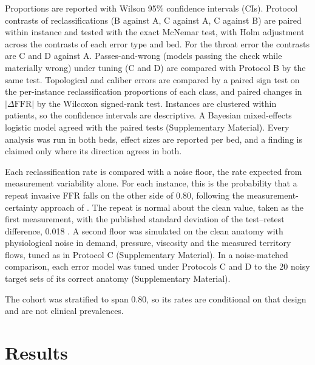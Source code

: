 \documentclass[journal,twoside,web]{ieeecolor}
\begin{document}
Proportions are reported with Wilson 95\% confidence intervals (CIs). Protocol contrasts of reclassifications (B against A, C against A, C against B) are paired within instance and tested with the exact McNemar test, with Holm adjustment across the contrasts of each error type and bed. For the throat error the contrasts are C and D against A. Passes-and-wrong (models passing the check while materially wrong) under tuning (C and D) are compared with Protocol B by the same test. Topological and caliber errors are compared by a paired sign test on
the per-instance reclassification proportions of each class, and paired changes in $|\Delta\mathrm{FFR}|$ by the Wilcoxon
signed-rank test. Instances are clustered within patients, so the confidence intervals are descriptive. A Bayesian mixed-effects logistic model agreed with the paired tests (Supplementary Material). Every analysis was run in both beds, effect sizes are reported per bed, and a finding is
claimed only where its direction agrees in both.

Each reclassification rate is compared with a noise floor, the rate expected from measurement variability alone. For each instance, this is the probability that a repeat invasive FFR falls on the other side of 0.80, following the measurement-certainty approach of \cite{petraco2013}. The repeat is normal about the clean value, taken as the first measurement, with the published standard deviation of the test--retest difference, 0.018 \cite{johnson2015}. A second floor was simulated on the clean anatomy with physiological
noise in demand, pressure, viscosity and the measured territory flows, tuned as in Protocol C (Supplementary Material). In a noise-matched comparison, each error model was tuned under Protocols C and D to the 20 noisy target sets of its correct anatomy (Supplementary Material).

The cohort was stratified to span 0.80, so its rates are conditional on that design and are not clinical prevalences.

\section{Results}
\end{document}
